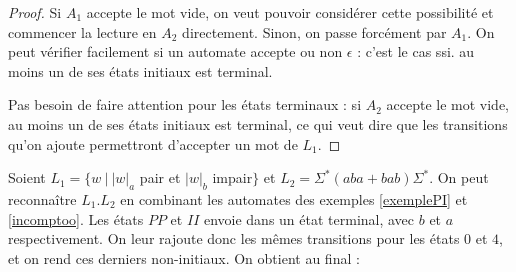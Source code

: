 \begin{proof}
Si $A_1$ accepte le mot vide, on veut pouvoir considérer cette possibilité et commencer la lecture en $A_2$ directement. Sinon, on passe forcément par $A_1$. On peut vérifier facilement si un automate accepte ou non $\epsilon$ : c'est le cas ssi. au moins un de ses états initiaux est terminal. 

Pas besoin de faire attention pour les états terminaux : si $A_2$ accepte le mot vide, au moins un de ses états initiaux est terminal, ce qui veut dire que les transitions qu'on ajoute permettront d'accepter un mot de $L_1$.
\end{proof}

\begin{example}
Soient $L_1 = \{w ~|~|w|_a$ pair et $|w|_b$ impair$\}$ et $L_2 = \Sigma^*(aba+bab)\Sigma^*$. On peut reconnaître $L_1.L_2$ en combinant les automates des exemples \ref{exemplePI} et \ref{incomptoo}. Les états $PP$ et $II$ envoie dans un état terminal, avec $b$ et $a$ respectivement. On leur rajoute donc les mêmes transitions pour les états $0$ et $4$, et on rend ces derniers non-initiaux. On obtient au final :


\begin{figure}[H]
\hspace{-2cm}
\end{figure}
\end{example}
